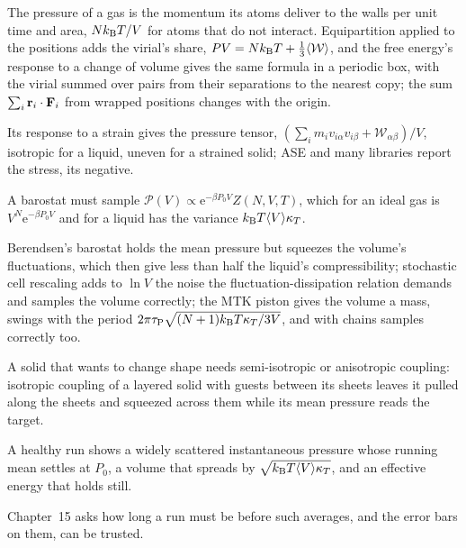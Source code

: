 
The pressure of a gas is the momentum its atoms deliver to the walls per
unit time and area, $Nk_{\mathrm{B}} T/V$ for atoms that do not interact.
Equipartition applied to the positions adds the virial's share, $PV =
Nk_{\mathrm{B}} T + \frac13\langle \mathcal{W} \rangle$, and the free energy's response to a
change of volume gives the same formula in a periodic box, with the virial
summed over pairs from their separations to the nearest copy; the sum
$\sum_i\bm{\mathrm{r}}_i\cdot\bm{\mathrm{F}}_i$ from wrapped positions changes with the
origin.

Its response to a strain gives the pressure tensor,
$(\sum_im_iv_{i\alpha}v_{i\beta} + \mathcal{W}_{\alpha\beta})/V$, isotropic for
a liquid, uneven for a strained solid; ASE and many libraries report the
stress, its negative.

A barostat must sample $\mathcal{P}(V) \propto
\mathrm{e}^{-\beta P_0V}Z(N, V, T)$, which for an ideal gas is
$V^N\mathrm{e}^{-\beta P_0V}$ and for a liquid has the variance $k_{\mathrm{B}}
T\langle V \rangle\kappa_T$.

Berendsen's barostat holds the mean pressure but squeezes the
volume's fluctuations, which then give less than half the liquid's
compressibility; stochastic cell
rescaling adds to $\ln V$ the noise the fluctuation-dissipation relation
demands and samples the volume correctly; the MTK piston gives the volume
a mass, swings with the period $2\pi\tau_{\mathrm P}\sqrt{(N + 1)k_{\mathrm{B}} T
\kappa_T/3V}$, and with chains samples correctly too.

A solid that wants to
change shape needs semi-isotropic or anisotropic coupling: isotropic
coupling of a layered solid with guests between its sheets leaves it
pulled along the sheets and squeezed across them while its mean pressure
reads the target.

A healthy run shows a widely scattered instantaneous
pressure whose running mean settles at $P_0$, a volume that spreads by
$\sqrt{k_{\mathrm{B}} T\langle V \rangle\kappa_T}$, and an effective energy that holds still.

Chapter~15 asks how long a run must be before such averages, and the
error bars on them, can be trusted.
